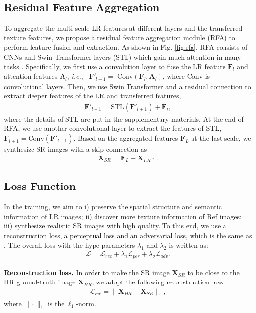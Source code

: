 \documentclass[runningheads]{llncs}
\def\ie{\mbox{\textit{i.e.}, }}
\def\mL{{\mathcal L}}
\def\bA{{\bm{A}}}
\def\bF{{\bm{F}}}
\def\bX{{\bm{X}}}
\def\Conv{{\mathrm{Conv}}}
\def\STL{{\mathrm{STL}}}
\begin{document}
\subsection{Residual Feature Aggregation}
To aggregate the multi-scale LR features at different layers and the transferred texture features, we propose a residual feature aggregation module (RFA) to perform feature fusion and extraction.
As shown in Fig. \ref{fig:rfa}, RFA consists of CNNs and Swin Transformer layers (STL) \cite{liu2021swin} which gain much attention in many tasks \cite{liang2021swinir,cao2021swin,liu2021video}.
Specifically, we first use a convolution layer to fuse the LR feature $\bF_{l}$ and attention features $\bA_l$, \ie
$\bF'_{l+1} =\; \Conv (\bF_{l}, \bA_l)$,
where $\Conv$ is convolutional layers. 
Then, we use Swin Transformer and a residual connection to extract deeper features of the LR and transferred features,
\begin{align}
    \bF'_{l+1} = \STL (\bF'_{l+1}) + \bF_l,
\end{align}
where the details of $\STL$ are put in the supplementary materials.
At the end of RFA, we use another convolutional layer to extract the features of STL, 
$ \bF_{l+1} = \Conv(\bF'_{l+1})$.  
Based on the aggregated features $\bF_{L}$ at the last scale, we synthesize SR images with a skip connection as 
\begin{align}
    \bX_{SR} = \bF_{L} + \bX_{LR\uparrow}.
\end{align}

\subsection{Loss Function}
In the training, we aim to i) preserve the spatial structure and semantic information of LR images; ii) discover more texture information of Ref images; iii) synthesize realistic SR images with high quality.
To this end, we use a reconstruction loss, a perceptual loss and an adversarial loss, which is the same as \cite{yang2020learning,jiang2021robust}.
The overall loss with the hype-parameters $\lambda_1$ and $\lambda_2$ is written as:
\begin{align}
    \mL = \mL_{rec} + \lambda_{1} \mL_{per} + \lambda_{2} \mL_{adv}.
\end{align}


\noindent\textbf{Reconstruction loss.}
In order to make the SR image $\bX_{SR}$ to be close to the HR ground-truth image $\bX_{HR}$, we adopt the following reconstruction loss
\begin{align}
    \mL_{rec} = \|\bX_{HR} - \bX_{SR} \|_1,
\end{align}
where $\|\cdot\|_1$ is the $\ell_1$-norm.
\end{document}
